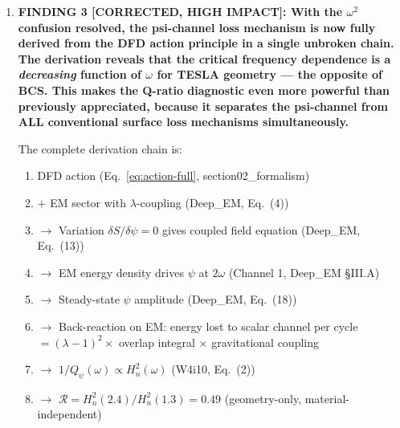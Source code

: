 \documentclass[11pt]{article}
\newcommand{\lbone}{|\lambda - 1|}
\newcommand{\Heff}{H_n}
\newcommand{\caution}[1]{\textcolor{orange}{\textbf{CAUTION:} #1}}
\theoremstyle{definition}
\theoremstyle{remark}
\begin{document}
\begin{tcolorbox}[colback=blue!5!white, colframe=blue!60!black,
  title=\textbf{W4i15 TOP 5 FINDINGS --- Ranked by Programme Impact}]
\begin{enumerate}
The expected $2\omega$ power level is extremely small:
$P_{2\omega}/P_\omega \sim (\lambda-1)^2 (G u_{\rm EM}/c^4) \sim
10^{-47}$ at $\lbone = 10^{-9}$. This is far below any realistic
noise floor. \caution{The $2\omega$ Poynting signal is a valid
prediction but is not detectable at Phase~I sensitivity. It becomes
relevant only if $\lbone \gg 10^{-9}$ (which would have been detected
already) or in a future experiment with parametric amplification
(Channel~2). The $2\omega$ channel should be \emph{monitored} (zero
cost if digitizer bandwidth allows) but is not a primary diagnostic
at Phase~I.}

\textbf{Revised assessment}: The true smoking gun at Phase~I
sensitivity remains the multi-frequency Q-ratio $\mathcal{R} = 0.49$
combined with C1--C6. The $2\omega$ Poynting channel is a
\emph{theoretical} smoking gun that validates the mechanism but is not
practically detectable at current sensitivity. Include it in the
proposal as a ``future confirmation pathway'' alongside the Nb$_3$Sn
broadband test.

\item \textbf{FINDING 3 [CORRECTED, HIGH IMPACT]: With the $\omega^2$
confusion resolved, the psi-channel loss mechanism is now fully
derived from the DFD action principle in a single unbroken chain.
The derivation reveals that the critical frequency dependence is
a \emph{decreasing} function of $\omega$ for TESLA geometry ---
the opposite of BCS. This makes the Q-ratio diagnostic even more
powerful than previously appreciated, because it separates the
psi-channel from ALL conventional surface loss mechanisms
simultaneously.}

The complete derivation chain is:
\begin{enumerate}[nosep]
\item DFD action (Eq.~\eqref{eq:action-full}, section02\_formalism)
\item $+$ EM sector with $\lambda$-coupling (Deep\_EM, Eq.~(4))
\item $\to$ Variation $\delta S/\delta\psi = 0$ gives coupled field
  equation (Deep\_EM, Eq.~(13))
\item $\to$ EM energy density drives $\psi$ at $2\omega$ (Channel 1,
  Deep\_EM \S III.A)
\item $\to$ Steady-state $\psi$ amplitude (Deep\_EM, Eq.~(18))
\item $\to$ Back-reaction on EM: energy lost to scalar channel per
  cycle $= (\lambda-1)^2 \times$ overlap integral $\times$
  gravitational coupling
\item $\to$ $1/Q_\psi(\omega) \propto \Heff^2(\omega)$ (W4i10,
  Eq.~(2))
\item $\to$ $\mathcal{R} = \Heff^2(2.4)/\Heff^2(1.3) = 0.49$
  (geometry-only, material-independent)
\end{enumerate}


\end{enumerate}
\end{tcolorbox}
\end{document}
